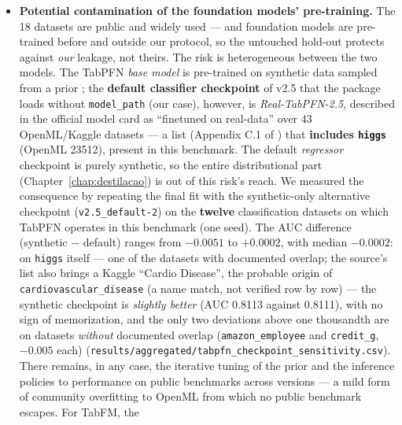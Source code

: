 \begin{itemize}
    elsewhere (maximum $-4.3\%$). The DL regression baselines are
    therefore slightly underestimated in those cases
    (\texttt{results/\allowbreak aggregated/\allowbreak dl\_\allowbreak target\_\allowbreak standardization.csv}).
  \item \textbf{Potential contamination of the foundation models'
    pre-training.} The 18 datasets are public and widely used ---
    and foundation models are pre-trained before and outside our
    protocol, so the untouched hold-out protects against \emph{our}
    leakage, not theirs. The risk is heterogeneous between the two
    models. The TabPFN \emph{base model} is pre-trained on synthetic
    data sampled from a prior \citep{hollmann2025}; the
    \textbf{default classifier checkpoint} of v2.5 that the package
    loads without \texttt{model\_path} (our case), however, is
    \emph{Real-TabPFN-2.5}, described in the official model card as
    ``finetuned on real-data'' over 43 OpenML/Kaggle datasets --- a
    list (Appendix C.1 of \citealp{priorlabs2025}) that
    \textbf{includes \texttt{higgs}} (OpenML 23512), present in this
    benchmark. The default \emph{regressor} checkpoint is purely
    synthetic, so the entire distributional part
    (Chapter~\ref{chap:destilacao}) is out of this risk's reach. We
    measured the consequence by repeating the final fit with the
    synthetic-only alternative checkpoint
    (\texttt{v2.5\_default-2}) on the \textbf{twelve}
    classification datasets on which TabPFN operates in this
    benchmark (one seed). The AUC difference (synthetic $-$
    default) ranges from $-0.0051$ to $+0.0002$, with median
    $-0.0002$: on \texttt{higgs} itself --- one of the datasets
    with documented overlap; the source's list also brings a Kaggle
    ``Cardio Disease'', the probable origin of
    \texttt{cardiovascular\_disease} (a name match, not verified
    row by row) --- the synthetic checkpoint is \emph{slightly
    better} (AUC 0.8113 against 0.8111), with no sign of
    memorization, and the only two deviations above one thousandth
    are on datasets \emph{without} documented overlap
    (\texttt{amazon\_\allowbreak employee} and \texttt{credit\_g},
    $-0.005$ each)
    (\texttt{results/\allowbreak aggregated/\allowbreak tabpfn\_\allowbreak checkpoint\_\allowbreak sensitivity.csv}).
    There remains, in any case, the iterative tuning of the prior
    and the inference policies to performance on public benchmarks
    across versions --- a mild form of community overfitting to
    OpenML from which no public benchmark escapes. For TabFM, the

\end{itemize}
